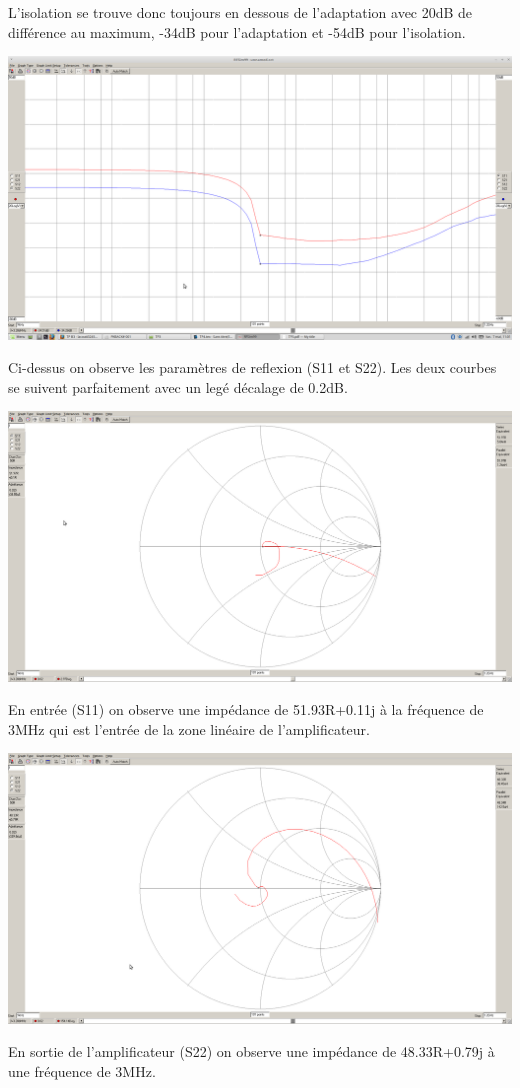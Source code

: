\documentclass[a4paper,12pt]{report}            %
\begin{document}
L'isolation se trouve donc toujours en dessous de l'adaptation avec 20dB de différence au maximum,
-34dB pour l'adaptation et -54dB pour l'isolation.
\begin{center}\includegraphics[scale = 0.25]{pic/reflexion.png}\\ \end{center}
Ci-dessus on observe les paramètres de reflexion (S11 et S22). Les deux courbes se suivent
parfaitement avec un legé décalage de 0.2dB.
\begin{center}\includegraphics[scale = 0.25]{pic/entree.png}\\ \end{center}
En entrée (S11) on observe une impédance de 51.93R+0.11j à la fréquence de 3MHz qui est l'entrée de 
la zone linéaire de l'amplificateur.
\begin{center}\includegraphics[scale = 0.25]{pic/sortie.png}\\ \end{center}
En sortie de l'amplificateur (S22) on observe une impédance de 48.33R+0.79j à une fréquence de 3MHz.
\end{document}
